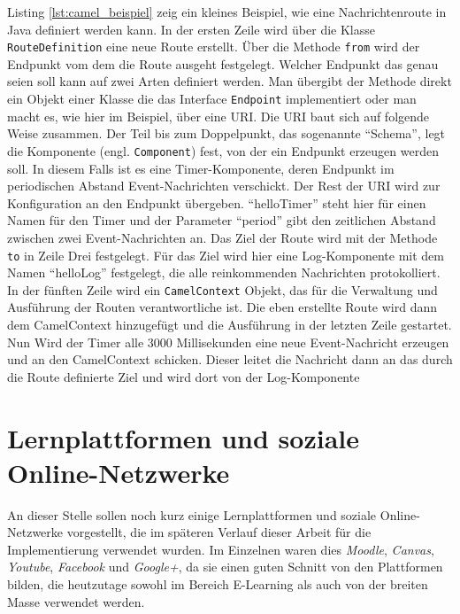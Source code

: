 Listing \ref{lst:camel_beispiel} zeig ein kleines Beispiel, wie eine Nachrichtenroute in Java definiert werden kann. In der ersten Zeile wird über die Klasse \texttt{RouteDefinition} eine neue Route erstellt. Über die Methode \texttt{from} wird der Endpunkt vom dem die Route ausgeht festgelegt. Welcher Endpunkt das genau seien soll kann auf zwei Arten definiert werden. Man übergibt der Methode direkt ein Objekt einer Klasse die das Interface \texttt{Endpoint} implementiert oder man macht es, wie hier im Beispiel, über eine URI. Die URI baut sich auf folgende Weise zusammen. Der Teil bis zum Doppelpunkt, das sogenannte \enquote{Schema}, legt die Komponente (engl. \texttt{Component}) fest, von der ein Endpunkt erzeugen werden soll. In diesem Falls ist es eine Timer-Komponente, deren Endpunkt im periodischen Abstand Event-Nachrichten verschickt. Der Rest der URI wird zur Konfiguration an den Endpunkt übergeben. \enquote{helloTimer} steht hier für einen Namen für den Timer und der Parameter \enquote{period} gibt den zeitlichen Abstand zwischen zwei Event-Nachrichten an. Das Ziel der Route wird mit der Methode \texttt{to} in Zeile Drei festgelegt. Für das Ziel wird hier eine Log-Komponente mit dem Namen \enquote{helloLog} festgelegt, die alle reinkommenden Nachrichten protokolliert. In der fünften Zeile wird ein \texttt{CamelContext} Objekt, das für die Verwaltung und Ausführung der Routen verantwortliche ist. Die eben erstellte Route wird dann dem CamelContext hinzugefügt und die Ausführung in der letzten Zeile gestartet. Nun Wird der Timer alle 3000 Millisekunden eine neue Event-Nachricht erzeugen und an den CamelContext schicken. Dieser leitet die Nachricht dann an das durch die Route definierte Ziel und wird dort von der Log-Komponente




\section{Lernplattformen und soziale Online-Netzwerke} %
\label{sec:lernplattformen_und_soziale_online_netzwerke}

An dieser Stelle sollen noch kurz einige Lernplattformen und soziale Online-Netzwerke vorgestellt, die im späteren Verlauf dieser Arbeit für die Implementierung verwendet wurden. Im Einzelnen waren dies \emph{Moodle}, \emph{Canvas}, \emph{Youtube}, \emph{Facebook} und \emph{Google+}, da sie einen guten Schnitt von den Plattformen bilden, die heutzutage sowohl im Bereich E-Learning als auch von der breiten Masse verwendet werden.

